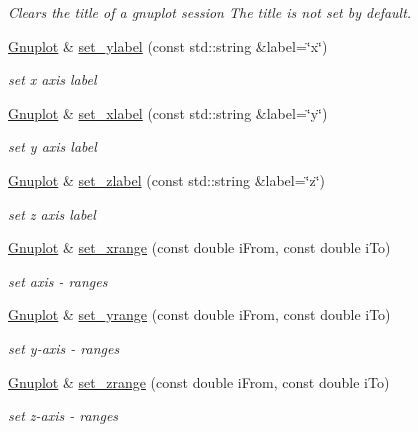 \begin{DoxyCompactItemize}
\begin{DoxyCompactList}\small\item\em \-Clears the title of a gnuplot session \-The title is not set by default. \end{DoxyCompactList}\item 
\hyperlink{classGnuplot}{\-Gnuplot} \& \hyperlink{classGnuplot_afcb311938827f8718f19ed52d66bad7c}{set\-\_\-ylabel} (const std\-::string \&label=\char`\"{}x\char`\"{})
\begin{DoxyCompactList}\small\item\em set x axis label \end{DoxyCompactList}\item 
\hyperlink{classGnuplot}{\-Gnuplot} \& \hyperlink{classGnuplot_aa93589a95aeab869ba731e2583843ae4}{set\-\_\-xlabel} (const std\-::string \&label=\char`\"{}y\char`\"{})
\begin{DoxyCompactList}\small\item\em set y axis label \end{DoxyCompactList}\item 
\hyperlink{classGnuplot}{\-Gnuplot} \& \hyperlink{classGnuplot_ab3206e715d20f05cc0dd1eec89ce8b07}{set\-\_\-zlabel} (const std\-::string \&label=\char`\"{}z\char`\"{})
\begin{DoxyCompactList}\small\item\em set z axis label \end{DoxyCompactList}\item 
\hyperlink{classGnuplot}{\-Gnuplot} \& \hyperlink{classGnuplot_a4b8d96018f2d2d4e2922d4df153d6a84}{set\-\_\-xrange} (const double i\-From, const double i\-To)
\begin{DoxyCompactList}\small\item\em set axis -\/ ranges \end{DoxyCompactList}\item 
\hyperlink{classGnuplot}{\-Gnuplot} \& \hyperlink{classGnuplot_a461271b7bfd4f84bdfc0055457226f28}{set\-\_\-yrange} (const double i\-From, const double i\-To)
\begin{DoxyCompactList}\small\item\em set y-\/axis -\/ ranges \end{DoxyCompactList}\item 
\hyperlink{classGnuplot}{\-Gnuplot} \& \hyperlink{classGnuplot_a7273f6a48024117b4d234d0251106e78}{set\-\_\-zrange} (const double i\-From, const double i\-To)
\begin{DoxyCompactList}\small\item\em set z-\/axis -\/ ranges \end{DoxyCompactList}\item 

\end{DoxyCompactItemize}
